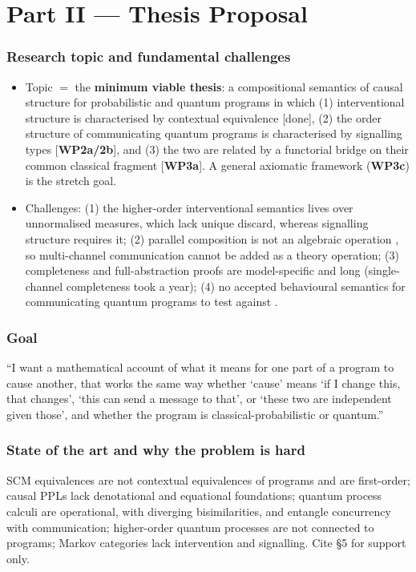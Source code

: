 \documentclass[11pt,a4paper]{article}
\newif\ifskeletonnotes
\newcommand{\sknote}[1]{\ifskeletonnotes{\small\color{blue!60!black}\textit{[#1]}}\fi}
\newcommand{\WP}[1]{\textbf{WP#1}}
\begin{document}
\part*{Part II --- Thesis Proposal}
\sknote{$\approx$6 pages, self-contained. Headings follow the handbook's questions (i)--(vi).}

\section{Research topic and fundamental challenges}\sknote{(i); $\frac12$ page}
\begin{itemize}[nosep]
\item Topic $=$ the \textbf{minimum viable thesis}: a compositional semantics of causal structure for probabilistic and quantum programs in which (1) interventional structure is characterised by contextual equivalence [done], (2) the order structure of communicating quantum programs is characterised by signalling types [\WP{2a/2b}], and (3) the two are related by a functorial bridge on their common classical fragment [\WP{3a}]. A general axiomatic framework (\WP{3c}) is the stretch goal.
\item Challenges: (1) the higher-order interventional semantics lives over unnormalised measures, which lack unique discard, whereas signalling structure requires it; (2) parallel composition is not an algebraic operation \cite{stark:freamp,CSP_van_Glabbeek_2010}, so multi-channel communication cannot be added as a theory operation; (3) completeness and full-abstraction proofs are model-specific and long (single-channel completeness took a year); (4) no accepted behavioural semantics for communicating quantum programs to test against \cite{lqCCS_10.1145/3632885}.
\end{itemize}

\section{Goal}\sknote{(ii), jargon-free; $\frac14$ page}
``I want a mathematical account of what it means for one part of a program to cause another, that works the same way whether `cause' means `if I change this, that changes', `this can send a message to that', or `these two are independent given those', and whether the program is classical-probabilistic or quantum.''

\section{State of the art and why the problem is hard}\sknote{(iii); $\frac12$ page, readable without Part I}
SCM equivalences are not contextual equivalences of programs and are first-order; causal PPLs lack denotational and equational foundations; quantum process calculi are operational, with diverging bisimilarities, and entangle concurrency with communication; higher-order quantum processes are not connected to programs; Markov categories lack intervention and signalling. Cite \S5 for support only.
\end{document}
